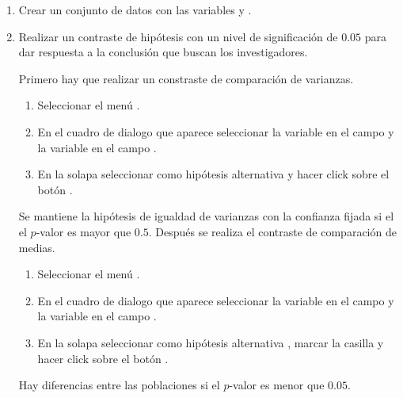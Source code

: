 \begin{enumerate}[leftmargin=*]
\begin{enumerate}
\item Crear un conjunto de datos con las variables  y .

\item Realizar un contraste de hipótesis con un nivel de significación de $0.05$ para dar respuesta a la conclusión que
buscan los investigadores.
\begin{indicacion}{
Primero hay que realizar un constraste de comparación de varianzas.
\begin{enumerate}
\item Seleccionar el menú .
\item En el cuadro de dialogo que aparece seleccionar la variable  en el campo  y la
variable  en el campo .
\item En la solapa  seleccionar como hipótesis alternativa  y hacer click
sobre el botón .
\end{enumerate}
Se mantiene la hipótesis de igualdad de varianzas con la confianza fijada si el el $p$-valor es mayor que $0.5$. 
Después se realiza el contraste de comparación de medias.
\begin{enumerate}
\item Seleccionar el menú .
\item En el cuadro de dialogo que aparece seleccionar la variable  en el campo  y la
variable  en el campo .
\item En la solapa  seleccionar como hipótesis alternativa ,
marcar la casilla  y hacer click sobre el botón .
\end{enumerate}
Hay diferencias entre las poblaciones si el $p$-valor es menor que $0.05$.
}
\end{indicacion}
\end{enumerate}



\end{enumerate}
